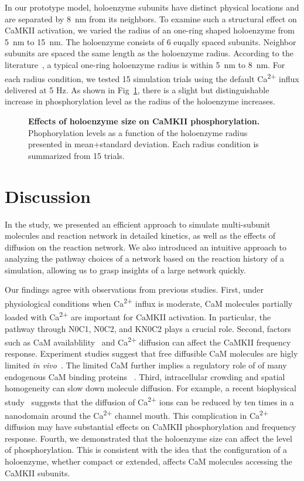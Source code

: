 \documentclass[10pt,letterpaper]{article}
\begin{document}
In our prototype model, holoenzyme subunits have distinct physical locations and are separated by \SI{8}{\nm} from its neighbors. To examine such a structural effect on CaMKII activation, we varied the radius of an one-ring shaped holoenzyme from \SI{5}{\nm} to \SI{15}{\nm}. The holoenzyme consists of 6 euqally spaced subunits. Neighbor subunits are spaced the same length as the holoenzyme radius. According to the literature~\cite{Chao:2011iw,Gaertner:2004jk}, a typical one-ring holoenzyme radius is within \SI{5}{\nm} to \SI{8}{\nm}. For each radius condition, we tested 15 simulation trials using the default Ca\textsuperscript{2+} influx delivered at 5 Hz. As shown in Fig~\ref{fig13}, there is a slight but distinguishable increase in phosphorylation level as the radius of the holoenzyme increases.

\begin{figure}[!h]
	\caption{{\bf Effects of holoenzyme size on CaMKII phosphorylation.}
	Phophorylation levels as a function of the holoenzyme radius presented in mean+standard deviation. Each radius condition is summarized from 15 trials.
	}
\label{fig13}
\end{figure}


\section*{Discussion}
In the study, we presented an efficient approach to simulate multi-subunit molecules and reaction network in detailed kinetics, as well as the effects of diffusion on the reaction network. We also introduced an intuitive approach to analyzing the pathway choices of a network based on the reaction history of a simulation, allowing us to grasp insights of a large network quickly.

Our findings agree with observations from previous studies. First, under physiological conditions when Ca\textsuperscript{2+} influx is moderate, CaM molecules partially loaded with Ca\textsuperscript{2+} are important for CaMKII activation. In particular, the pathway through N0C1, N0C2, and KN0C2 plays a crucial role. Second, factors such as CaM availablility~\cite{DeKoninck:1998wh} and Ca\textsuperscript{2+} diffusion can affect the CaMKII frequency response. Experiment studies suggest that free diffusible CaM molecules are higly limited \textit{in vivo}~\cite{2008BpJ....95.6002S,Persechini:2002tb,LubyPhelps:1995kl}. The limited CaM further implies a regulatory role of of many endogenous CaM binding proteins ~\cite{Skene:1990kf}. Third, intracellular crowding and spatial homogeneity can slow down molecule diffusion. For example, a recent biophysical study~\cite{2013PNAS..11015794T} suggests that the diffusion of Ca\textsuperscript{2+} ions can be reduced by ten times in a nanodomain around the Ca\textsuperscript{2+} channel mouth. This complication in Ca\textsuperscript{2+} diffusion may have substantial effects on CaMKII phosphorylation and frequency response. Fourth, we demonstrated that the holoenzyme size can affect the level of phosphorylation. This is consistent with the idea that the configuration of a holoenzyme, whether compact or extended, affects CaM molecules accessing the CaMKII subunits.
\end{document}

